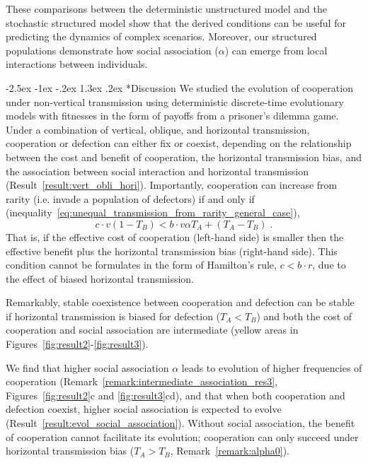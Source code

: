 \documentclass[12pt]{extarticle}
\makeatletter
\renewcommand\section{\@startsection {section}{1}{\z@}%
     {-2.5ex \@plus -1ex \@minus -.2ex}%
     {1.3ex \@plus.2ex}%
    {\Large\bfseries}}
\makeatother
\begin{document}
These comparisons between the deterministic unstructured model and the stochastic structured model show that the derived conditions can be useful for predicting the dynamics of complex scenarios. 
Moreover, our structured populations demonstrate how social association ($\alpha$) can emerge from local interactions between individuals.


\section*{Discussion}
We studied the evolution of cooperation under non-vertical transmission using deterministic discrete-time evolutionary models with fitnesses in the form of payoffs from a prisoner's dilemma game. 
Under a combination of vertical, oblique, and horizontal transmission, cooperation or defection can either fix or coexist, depending on the relationship between the cost and benefit of cooperation, the horizontal transmission bias, and the association between social interaction and horizontal transmission (Result~\autoref{result:vert_obli_hori}).
Importantly, cooperation can increase from rarity (i.e. invade a population of defectors) if and only if (inequality~\ref{eq:unequal_transmission_from_rarity_general_case}),
\begin{equation}
c \cdot v (1-T_B) < b \cdot v \alpha T_A + (T_A - T_B) \;.
\end{equation}
That is, if the effective cost of cooperation (left-hand side) is smaller then the effective benefit plus the horizontal transmission bias (right-hand side).
This condition cannot be formulates in the form of Hamilton's rule, $c<b \cdot r$, due to the effect of biased horizontal transmission.

Remarkably, stable coexistence between cooperation and defection can be stable if horizontal transmission is biased for defection ($T_A<T_B$) and both the cost of cooperation and social association are intermediate (yellow areas in Figures~\ref{fig:result2}-\ref{fig:result3}).

We find that higher social association $\alpha$ leads to evolution of higher frequencies of cooperation (Remark~\autoref{remark:intermediate_association_res3}, Figures~\ref{fig:result2}c and \ref{fig:result3}cd), and that when both cooperation and defection coexist, higher social association is expected to evolve (Result~\ref{result:evol_social_association}).
Without social association, the benefit of cooperation cannot facilitate its evolution; cooperation can only succeed under horizontal transmission bias ($T_A>T_B$, Remark~\ref{remark:alpha0}). 
\end{document}
